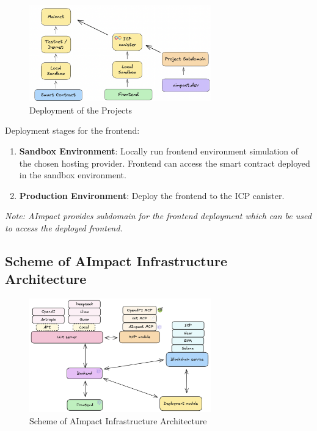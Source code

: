 \documentclass[12pt,a4paper]{article}
\begin{document}
\begin{figure}[h]
    \centering
    \includegraphics[width=0.7\textwidth]{imgs/deployment.png}
    \caption{Deployment of the Projects}
    \label{fig:deployment}
\end{figure}


Deployment stages for the frontend:
\begin{enumerate}
    \item \textbf{Sandbox Environment}: Locally run frontend environment simulation of the chosen hosting provider.
    Frontend can access the smart contract deployed in the sandbox environment.
    \item \textbf{Production Environment}: Deploy the frontend to the ICP canister.
\end{enumerate}

\textit{Note: AImpact provides subdomain for the frontend deployment which can be used to access the deployed frontend.}




\subsection{Scheme of AImpact Infrastructure Architecture}


\begin{figure}[h]
    \centering
    \includegraphics[width=0.7\textwidth]{imgs/architecture.png}
    \caption{Scheme of AImpact Infrastructure Architecture}
    \label{fig:architecture}
\end{figure}
\end{document}
